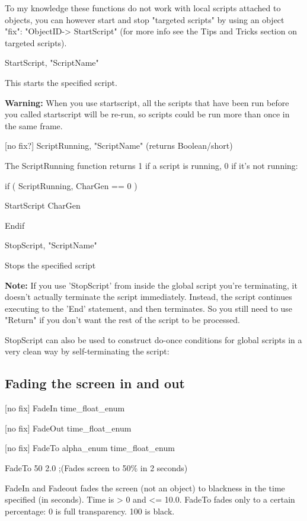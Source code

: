 To my knowledge these functions do not work with local scripts attached
to objects, you can however start and stop "targeted scripts" by using
an object "fix": "ObjectID-> StartScript" (for more info see
the Tips and Tricks section on targeted scripts).

StartScript, "ScriptName"

This starts the specified script.

\textbf{Warning:} When you use startscript, all the scripts that have
been run before you called startscript will be re-run, so scripts could
be run more than once in the same frame.

{[}no fix?{]} ScriptRunning, "ScriptName" (returns Boolean/short)

The ScriptRunning function returns 1 if a script is running, 0 if it's
not running:

if ( ScriptRunning, CharGen == 0 )

StartScript CharGen

Endif

StopScript, "ScriptName"

Stops the specified script

\textbf{Note:} If you use 'StopScript' from inside the global script
you're terminating, it doesn't actually terminate the script
immediately. Instead, the script continues executing to the 'End'
statement, and then terminates. So you still need to use "Return" if you
don't want the rest of the script to be processed.

StopScript can also be used to construct do-once conditions for global
scripts in a very clean way by self-terminating the script:



\hypertarget{fading-the-screen-in-and-out}{%
\subsection{Fading the screen in and
out}\label{fading-the-screen-in-and-out}}

{[}no fix{]} FadeIn time\_float\_enum

{[}no fix{]} FadeOut time\_float\_enum

{[}no fix{]} FadeTo alpha\_enum time\_float\_enum

FadeTo 50 2.0 ;(Fades screen to 50\% in 2 seconds)

FadeIn and Fadeout fades the screen (not an object) to blackness in the
time specified (in seconds). Time is > 0 and <=
10.0. FadeTo fades only to a certain percentage: 0 is full transparency.
100 is black.

